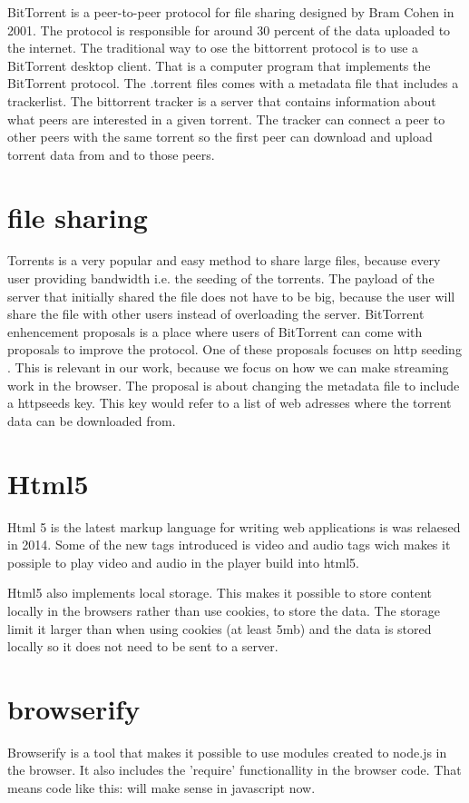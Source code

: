 BitTorrent is a peer-to-peer protocol for file sharing designed by Bram Cohen in 2001.
The protocol is responsible for around 30 percent of the data uploaded to the internet.
The traditional way to ose the bittorrent protocol is to use a BitTorrent desktop client. That is a computer program that implements the BitTorrent protocol.
The .torrent files comes with a metadata file that includes a trackerlist. The bittorrent tracker is a server that contains information about what peers are interested in a given torrent. The tracker can connect a peer to other peers with the same torrent so the first peer can download and upload torrent data from and to those peers.

\section{file sharing}
Torrents is a very popular and easy method to share large files, because every user providing bandwidth i.e. the seeding of the torrents.
The payload of the server that initially shared the file does not have to be big, because the user will share the file with other users instead of overloading the server.
BitTorrent enhencement proposals is a place where users of BitTorrent can come with proposals to improve the protocol.
One of these proposals focuses on http seeding \citep{httpSeed}.
This is relevant in our work, because we focus on how we can make streaming work in the browser. The proposal is about changing the metadata file to include a httpseeds key. This key would refer to a list of web adresses where the torrent data can be downloaded from.

\section{Html5}
Html 5 is the latest markup language for writing web applications is was relaesed in 2014. Some of the new tags introduced is video and audio tags wich makes it possiple to play video and audio in the player build into html5.

Html5 also implements local storage. This makes it possible to store content locally in the browsers rather than use cookies, to store the data.
The storage limit it larger than when using cookies (at least 5mb) and the data is stored locally so it does not need to be sent to a server.

\section{browserify}
Browserify is a tool that makes it possible to use modules created to node.js in the browser. It also includes the 'require' functionallity in the browser code. That means code like this:
will make sense in javascript now.

